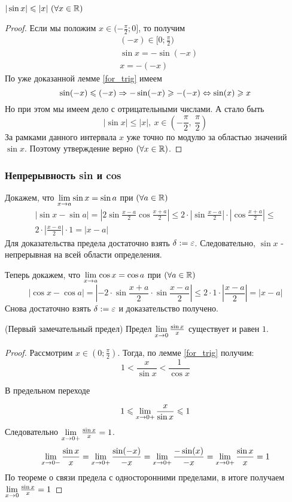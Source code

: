 \begin{corollary}
	$|\sin x| \leqslant |x|\ (\forall x \in \mathbb{R})$
\end{corollary}

\begin{proof}
	Если мы положим $x \in (-\frac{\pi}{2}; 0]$, то получим
	\begin{align*}
		&(-x) \in [0; \frac{\pi}{2})
		\\
		&\sin x = -\sin (-x)
		\\
		&x = -(-x)
	\end{align*}
	По уже доказанной лемме \ref{for_trig} имеем
	\[
		\sin (-x) \leqslant (-x) \Rightarrow -\sin (-x) \geqslant -(-x) \Leftrightarrow \sin(x) \geqslant x
	\]
	Но при этом мы имеем дело с отрицательными числами. А стало быть
	\[
		|\sin x| \le |x|,\ x \in \left(-\frac{\pi}{2},\ \frac{\pi}{2}\right)
	\]
	За рамками данного интервала $x$ уже точно по модулю за областью значений $\sin x$. Поэтому утверждение верно $(\forall x \in \mathbb{R})$.
\end{proof}

\subsubsection*{Непрерывность sin и cos}

Докажем, что $\lim\limits_{x \to a} \sin x = \sin a$ при $(\forall a \in \mathbb{R})$
\begin{multline*}
	|\sin x - \sin a| = \left|2 \sin \frac{x - a}{2} \cos \frac{x + a}{2}\right| \le 2 \cdot \left|\sin \frac{x - a}{2}\right| \cdot \left|\cos \frac{x + a}{2}\right| \le \\
	2 \cdot \left|\frac{x - a}{2}\right| \cdot 1 = |x - a|
\end{multline*}
Для доказательства предела достаточно взять $\delta := \varepsilon$. Следовательно, $\sin x$ - непрерывная на всей области определения.

Теперь докажем, что $\lim\limits_{x \to a} \cos x = \cos a$ при $(\forall a \in \mathbb{R})$
\[
	|\cos x - \cos a| = \left|-2 \cdot \sin \frac{x + a}{2} \cdot \sin \frac{x - a}{2} \right| \le 2 \cdot 1 \cdot \left|\frac{x - a}{2}\right| = |x - a|
\]
Снова достаточно взять $\delta := \varepsilon$ и доказательство получено.


\begin{theorem} (Первый замечательный предел) Предел $\lim\limits_{x \to 0} \frac{\sin x}{x}$ существует и равен $1$.
\end{theorem}

\begin{proof}
	Рассмотрим $x \in (0; \frac{\pi}{2})$. Тогда, по лемме \ref{for_trig} получим:
	\[
		1 < \frac{x}{\sin x} < \frac{1}{\cos x}
	\]
	
	В предельном переходе
	
	\[
		1 \leqslant \lim\limits_{x \to 0+} \frac{x}{\sin x} \leqslant 1
	\]
	Следовательно $\lim\limits_{x \to 0+} \frac{\sin x}{x} = 1$.
	\[
		\lim\limits_{x \to 0-} \frac{\sin x}{x} = \lim\limits_{x \to 0+} \frac{\sin(-x)}{-x} = \lim\limits_{x \to 0+} \frac{-\sin(x)}{-x} = \lim\limits_{x \to 0+} \frac{\sin x}{x} = 1
	\]
	По теореме о связи предела с односторонними пределами, в итоге получаем $\lim\limits_{x \to 0} \frac{\sin x}{x} = 1$
\end{proof}

